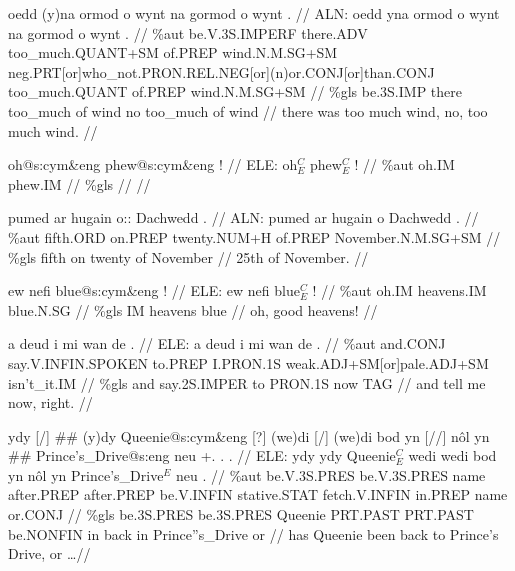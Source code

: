 \documentclass[a4paper,10pt]{article}
\begin{document}
\ex
\begingl[lingstyle=gergl]
\glchat oedd (y)na ormod o wynt na gormod o wynt . //
\glsurface ALN:  oedd yna ormod o wynt na gormod o wynt .  //
\glauto \%aut  be{\scriptsize .V.3S.IMPERF} there{\scriptsize .ADV} too\_much{\scriptsize .QUANT+SM} of{\scriptsize .PREP} wind{\scriptsize .N.M.SG+SM} neg{\scriptsize .PRT[or]who\_not.PRON.REL.NEG[or](n)or.CONJ[or]than.CONJ} too\_much{\scriptsize .QUANT} of{\scriptsize .PREP} wind{\scriptsize .N.M.SG+SM}   //
\glmanual \%gls  be{\scriptsize .3S.IMP} there too\_much of wind no too\_much of wind   //
\gleng there was too much wind, no, too much wind. //
\endgl
\xe

\ex
\begingl[lingstyle=gergl]
\glchat oh@s:cym\&eng phew@s:cym\&eng ! //
\glsurface ELE:  oh$^{C}_{E}$ phew$^{C}_{E}$ !  //
\glauto \%aut  oh{\scriptsize .IM} phew{\scriptsize .IM}   //
\glmanual \%gls      //
\gleng  //
\endgl
\xe

\ex
\begingl[lingstyle=gergl]
\glchat pumed ar hugain o:: Dachwedd . //
\glsurface ALN:  pumed ar hugain o Dachwedd .  //
\glauto \%aut  fifth{\scriptsize .ORD} on{\scriptsize .PREP} twenty{\scriptsize .NUM+H} of{\scriptsize .PREP} November{\scriptsize .N.M.SG+SM}   //
\glmanual \%gls  fifth on twenty of November   //
\gleng 25th of November. //
\endgl
\xe

\ex
\begingl[lingstyle=gergl]
\glchat ew nefi blue@s:cym\&eng ! //
\glsurface ELE:  ew nefi blue$^{C}_{E}$ !  //
\glauto \%aut  oh{\scriptsize .IM} heavens{\scriptsize .IM} blue{\scriptsize .N.SG}   //
\glmanual \%gls  IM heavens blue   //
\gleng oh, good heavens! //
\endgl
\xe

\ex
\begingl[lingstyle=gergl]
\glchat a deud i mi wan de . //
\glsurface ELE:  a deud i mi wan de .  //
\glauto \%aut  and{\scriptsize .CONJ} say{\scriptsize .V.INFIN.SPOKEN} to{\scriptsize .PREP} I{\scriptsize .PRON.1S} weak{\scriptsize .ADJ+SM[or]pale.ADJ+SM} isn't\_it{\scriptsize .IM}   //
\glmanual \%gls  and say{\scriptsize .2S.IMPER} to PRON{\scriptsize .1S} now TAG   //
\gleng and tell me now, right. //
\endgl
\xe

\ex
\begingl[lingstyle=gergl]
\glchat ydy [/] \#\# (y)dy Queenie@s:cym\&eng [?] (we)di [/] (we)di bod yn [//] nôl yn \#\# Prince's\_Drive@s:eng neu +. . . //
\glsurface ELE:  ydy ydy Queenie$^{C}_{E}$ wedi wedi bod yn nôl yn Prince's\_Drive$^{E}$ neu .  //
\glauto \%aut  be{\scriptsize .V.3S.PRES} be{\scriptsize .V.3S.PRES} name after{\scriptsize .PREP} after{\scriptsize .PREP} be{\scriptsize .V.INFIN} stative{\scriptsize .STAT} fetch{\scriptsize .V.INFIN} in{\scriptsize .PREP} name or{\scriptsize .CONJ}   //
\glmanual \%gls  be{\scriptsize .3S.PRES} be{\scriptsize .3S.PRES} Queenie PRT{\scriptsize .PAST} PRT{\scriptsize .PAST} be{\scriptsize .NONFIN} in back in Prince''s\_Drive or   //
\gleng has Queenie been back to Prince's Drive, or \dots  //
\endgl
\xe
\end{document}

